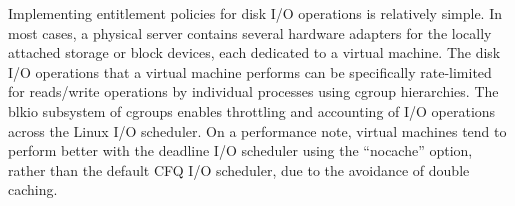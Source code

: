  
Implementing entitlement policies for disk I/O operations is relatively simple. In most cases, a physical server contains several hardware adapters for the locally attached storage or block devices, each dedicated to a virtual machine. The disk I/O operations that a virtual machine performs can be specifically rate-limited for reads/write operations by individual processes using cgroup hierarchies. The blkio subsystem of cgroups enables throttling and accounting of I/O operations across the Linux I/O scheduler. On a performance note, virtual machines tend to perform better with the deadline I/O scheduler using the ``nocache'' option, rather than the default CFQ I/O scheduler, due to the avoidance of double caching.
 
%
%
%
%
%

